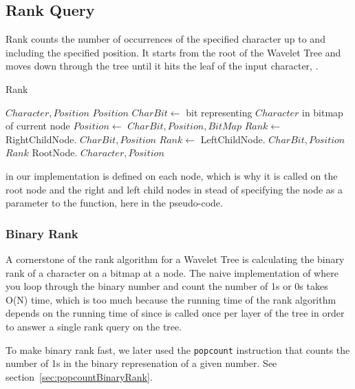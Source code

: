 \subsection{Rank Query}
Rank counts the number of occurrences of the specified character up to and including the specified position. 
It starts from the root of the Wavelet Tree and moves down through the tree until it hits the leaf of the input character, \citep[Section 2.2]{Claude08practicalrankselect}.

\begin{algorithm}
\caption{Rank}
\label{alg:rank}
\begin{algorithmic} 
 {$Character, Position$}
\State \Return $Position$
\EndIf
\State $CharBit \gets$ bit representing $Character$ in bitmap of current node
\State $Position \gets$  {$CharBit, Position, BitMap$}
	\State $Rank \gets$ RightChildNode. {$CharBit, Position$}
\Else
	\State $Rank \gets$ LeftChildNode. {$CharBit, Position$}
\EndIf
\State \Return $Rank$ 
\EndFunction
\State RootNode. {$Character, Position$}
\end{algorithmic}
\end{algorithm}


\noindent {} in our implementation is defined on each node, which is why it is called on the root node and the right and left child nodes in stead of specifying the node as a parameter to the  function, here in the pseudo-code.

\subsubsection{Binary Rank} 
\label{sec:TheoryBinaryRank}
A cornerstone of the rank algorithm for a Wavelet Tree is calculating the binary rank of a character on a bitmap at a node.
The naive implementation of  where you loop through the binary number and count the number of 1s or 0s takes O(N) time, which is too much because the running time of the rank algorithm depends on the running time of  since  is called once per layer of the tree in order to answer a single rank query on the tree.

To make binary rank fast, we later used the \texttt{popcount} instruction that counts the number of 1s in the binary represenation of a given number. See section~\ref{sec:popcountBinaryRank}.

